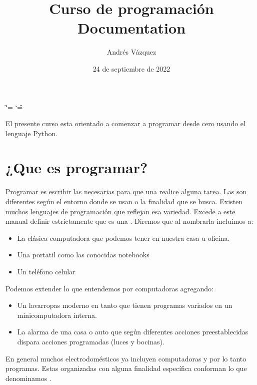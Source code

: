 \documentclass[a4paper,12pt,spanish]{sphinxmanual}
\title{Curso de programación Documentation}
\date{24 de septiembre de 2022}
\author{Andrés Vázquez}
\begin{document}
\ifdefined\shorthandoff
  \ifnum\catcode`\=\string=\active\shorthandoff{=}\fi
  \ifnum\catcode`\"=\active{}\fi
\fi

\pagestyle{empty}
\sphinxmaketitle
\pagestyle{plain}
\sphinxtableofcontents
\pagestyle{normal}
\label{\detokenize{index::doc}}


\sphinxAtStartPar
El presente curso esta orientado a comenzar a programar desde cero usando el lenguaje Python.

\sphinxstepscope


\chapter{¿Que es programar?}
\label{\detokenize{que:que-es-programar}}\label{\detokenize{que::doc}}
\sphinxAtStartPar
Programar es escribir las  necesarias para que una  realice alguna tarea.
Las  son diferentes según el entorno donde se usan o la finalidad que se busca.
Existen muchos lenguajes de programación que reflejan esa variedad.
Excede a este manual definir estrictamente que es una . Diremos que al nombrarla incluimos a:
\begin{itemize}
\item {} 
\sphinxAtStartPar
La clásica computadora que podemos tener en nuestra casa u oficina.

\item {} 
\sphinxAtStartPar
Una portatil como las conocidas notebooks

\item {} 
\sphinxAtStartPar
Un teléfono celular

\end{itemize}

\sphinxAtStartPar
Podemos extender lo que entendemos por computadoras agregando:
\begin{itemize}
\item {} 
\sphinxAtStartPar
Un lavarropas moderno en tanto que tienen programas variados en un mini\sphinxhyphen{}computadora interna.

\item {} 
\sphinxAtStartPar
La alarma de una casa o auto que según diferentes acciones pre\sphinxhyphen{}establecidas dispara acciones programadas (luces y bocinas).

\end{itemize}

\sphinxAtStartPar
En general muchos electrodomésticos ya incluyen computadoras y por lo tanto programas.
Estas  organizadas con alguna finalidad específica conforman lo que denominamos .
\end{document}
